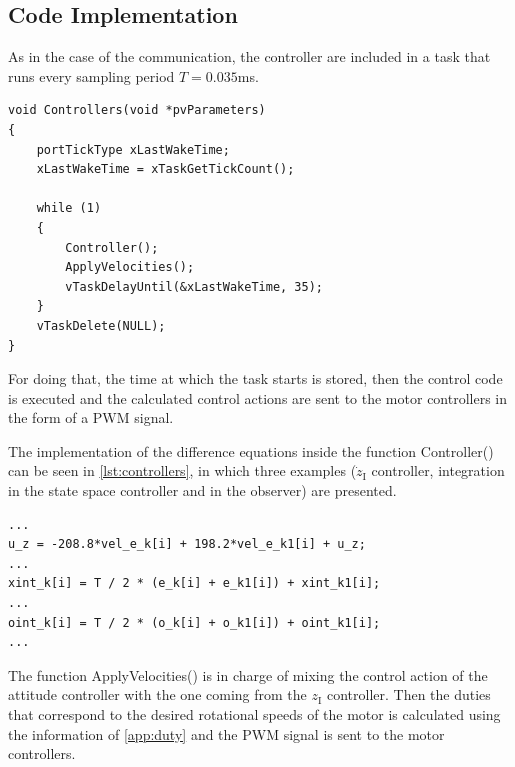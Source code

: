 \subsection{Code Implementation}
As in the case of the communication, the controller are included in a task that runs every sampling period $T=0.035$ms.

\begin{lstlisting}[style=customcpp,
caption={Code for the controller task.}, 
label=lst:controllerTask]
void Controllers(void *pvParameters)
{
	portTickType xLastWakeTime;
	xLastWakeTime = xTaskGetTickCount();
	
	while (1)
	{
		Controller();
		ApplyVelocities();
		vTaskDelayUntil(&xLastWakeTime, 35);
	}
	vTaskDelete(NULL);
}
\end{lstlisting}
For doing that, the time at which the task starts is stored, then the control code is executed and the calculated control actions are sent to the motor controllers in the form of a PWM signal.

The implementation of the difference equations inside the function Controller() can be seen in \autoref{lst:controllers}, in which three examples ($\dot{z}_{\mathrm{I}}$ controller, integration in the state space controller and in the observer) are presented.

\begin{lstlisting}[style=customcpp,
caption={Code for the controllers.}, 
label=lst:controllers]
...
u_z = -208.8*vel_e_k[i] + 198.2*vel_e_k1[i] + u_z;
...
xint_k[i] = T / 2 * (e_k[i] + e_k1[i]) + xint_k1[i];
...
oint_k[i] = T / 2 * (o_k[i] + o_k1[i]) + oint_k1[i];
...

\end{lstlisting}

The function ApplyVelocities() is in charge of mixing the control action of the attitude controller with the one coming from the $z_{\mathrm{I}}$ controller. Then the duties that correspond to the desired rotational speeds of the motor is calculated using the information of \autoref{app:duty} and the PWM signal is sent to the motor controllers.